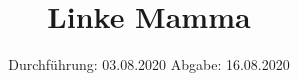 

\subject{TPS Praktikum}
\title{Linke Mamma}
\date{%
	Durchführung: 03.08.2020
	\hspace{3em}
	Abgabe: 16.08.2020
}


\maketitle
\thispagestyle{empty}
\tableofcontents
\newpage





\newpage

\printbibliography{}


